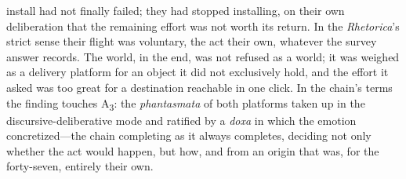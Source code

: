 install had not finally failed; they had stopped installing, on their own
deliberation that the remaining effort was not worth its return. In the
\textit{Rhetorica}'s strict sense their flight was voluntary, the act their
own, whatever the survey answer records. The world, in the end, was not refused as
a world; it was weighed as a delivery platform for an object it did not
exclusively hold, and the effort it asked was too great for a destination
reachable in one click. In the chain's terms the finding touches A\textsubscript{3}: the
\textit{phantasmata} of both platforms taken up in the
discursive-deliberative mode and ratified by a \textit{doxa} in which the
emotion concretized---the chain completing as it always completes, deciding
not only whether the act would happen, but how, and from an origin that
was, for the forty-seven, entirely their own.

